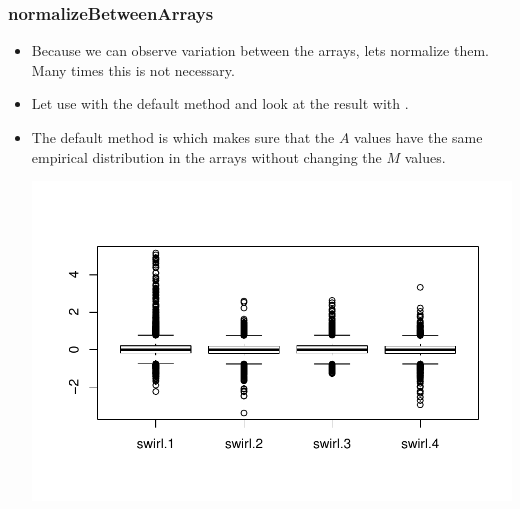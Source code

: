 \begin{frame}
  \frametitle{normalizeBetweenArrays}
  \begin{itemize}
  \item Because we can observe variation between the arrays, lets normalize them. Many times this is not necessary.
  \item Let use  with the default method and look at the result with .
  \item The default method is  which makes sure that the $A$ values have the same empirical distribution in the arrays without changing the $M$ values.
\begin{Schunk}
\end{Schunk}
\includegraphics{plots/fig-027}
  \end{itemize}
\end{frame}

